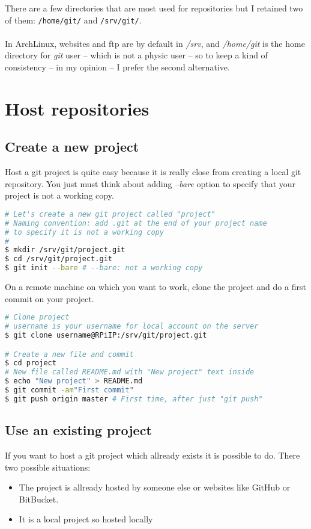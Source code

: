 There are a few directories that are most used for repositories but I retained two 
of them: \texttt{/home/git/} and \texttt{/srv/git/}. 
\\\\
In ArchLinux, websites and ftp are by default in \emph{/srv}, and \emph{/home/git} 
is the home directory for \emph{git} user -- which is not a physic user -- so to 
keep a kind of consistency -- in my opinion -- I prefer the second alternative. 

\section{Host repositories}
\subsection{Create a new project}
Host a git project is quite easy because it is really close from creating a local 
git repository. You just must think about adding \emph{--bare} option to specify 
that your project is not a working copy. 
\begin{lstlisting}[language=bash,caption=Create a repository on your server]
# Let's create a new git project called "project"
# Naming convention: add .git at the end of your project name
# to specify it is not a working copy
#
$ mkdir /srv/git/project.git
$ cd /srv/git/project.git
$ git init --bare # --bare: not a working copy
\end{lstlisting}

On a remote machine on which you want to work, clone the project and do a first 
commit on your project.
\begin{lstlisting}[language=bash,caption=Clone repository to work]
# Clone project
# username is your username for local account on the server 
$ git clone username@RPiIP:/srv/git/project.git

# Create a new file and commit
$ cd project
# New file called README.md with "New project" text inside
$ echo "New project" > README.md 
$ git commit -am"First commit"
$ git push origin master # First time, after just "git push"
\end{lstlisting}

\subsection{Use an existing project}
If you want to host a git project which allready exists it is possible to do. 
There two possible situations:
\begin{itemize}
	\item The project is allready hosted by someone else or websites like GitHub 
		  or BitBucket.
	\item It is a local project so hosted locally
\end{itemize}

